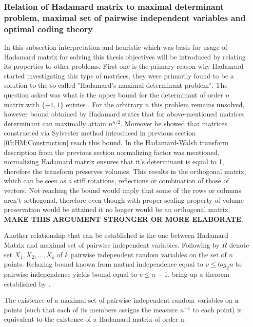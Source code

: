 \subsubsection{Relation of Hadamard matrix to maximal determinant problem, maximal set of pairwise independent variables and optimal coding theory}
In this subsection interpretation and heuristic which was basis for usage of Hadamard matrix for solving this thesis objectives will be introduced by relating its properties to other problems. 
First one is the primary reason why Hadamard started investigating this type of matrices, they were primarily found to be a solution to the so called "Hadamard's maximal determinant problem". The question asked was what is the upper bound for the determinant of order $n$ matrix with $\{-1, 1\}$ entries \cite{05_hadamard_maximal_determinant}. For the arbitrary $n$ this problem remains unsolved, however bound obtained by Hadamard states that for above-mentioned matrices determinant can maximally attain $n^{n/2}$. Moreover he showed that matrices constructed via Sylvester method introduced in previous section \ref{05:HM:Construction} reach this bound. 
In the Hadamard-Walsh transform description from the previous section normalizing factor was mentioned, normalizing Hadamard matrix ensures that it's determinant is equal to 1, therefore the transform preserves volumes. This results in the orthogonal matrix, which can be seen as a stiff rotations, reflections or combination of those of vectors. Not reaching the bound would imply that some of the rows or columns aren't orthogonal, therefore even though with proper scaling property of volume preservation would be attained it no longer would be an orthogonal matrix. {\color{red} \textbf{MAKE THIS ARGUMENT STRONGER OR MORE ELABORATE}}.
\par Another relationship that can be established is the one between Hadamard Matrix and maximal set of pairwise independent variables. 
Following \cite{05_hedayat_wallis_hadamard_matrices} by $R$ denote set ${X_1, X_2, \dots, X_k}$ of $k$ pairwise independent random variables on the set of $n$ points. Relaxing bound known from mutual independence equal to $v \leq log_2n$ to pairwise independence yields bound equal to $v \leq n-1$.
 bring up a theorem established by \cite{05_lancaster_maximal_set_of_pairwise_independent_variables}. 
\begin{theorem}
    The existence of a maximal set of pairwise independent random variables on n points (such that each of its members assigns the measure $n^{-1}$ to each point) is equivalent to the existence of a Hadamard matrix of order n.
\end{theorem}

